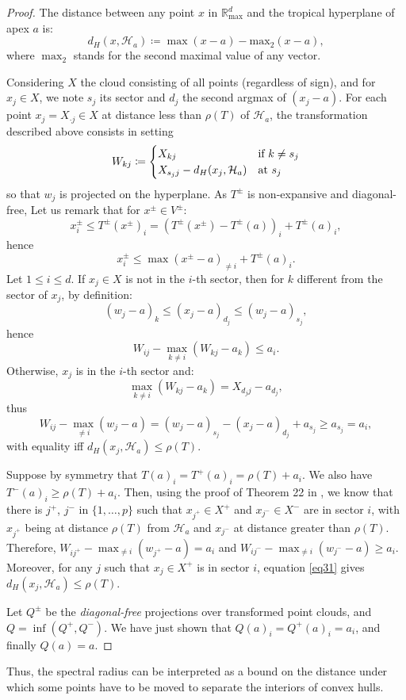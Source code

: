 \documentclass[oneside,UKenglish,a4paper]{amsart}
\numberwithin{equation}{section}
\numberwithin{figure}{section}
\theoremstyle{plain}
\theoremstyle{definition}
\theoremstyle{plain}
\theoremstyle{remark}
\theoremstyle{plain}
\theoremstyle{definition}
\theoremstyle{definition}
\begin{document}
\begin{proof}
The distance between any point $x$ in $\mathbb{R}_{\max}^d$ and the tropical hyperplane of apex $a$ is:
\[ d_H(x, \mathcal{H}_a) \coloneqq \max(x-a) - \text{max}_2 (x-a), \]
where $\max_2$ stands for the second maximal value of any vector.

Considering $X$ the cloud consisting of all points (regardless of
sign), and for $x_{j}\in X$, we note $s_{j}$
its sector and $d_{j}$ the second argmax of $(x_{j}-a)$. For each
point $x_{j}=X_{\cdot j}\in X$ at distance less than $\rho(T)$ of
$\mathcal{H}_{a}$, the transformation described above consists in setting 
\[
W_{kj}\coloneqq\begin{cases}
X_{kj} & \text{if \ensuremath{k\ne s_{j}}}\\
X_{s_{j}j}-d_H(x_{j},\mathcal{H}_{a}) & \text{at \ensuremath{s_{j}}}
\end{cases}
\]
so that $w_{j}$ is projected on the hyperplane. As $T^{\pm}$ is
non-expansive and diagonal-free, Let us remark that for $x^{\pm}\in V^{\pm}$:
\[
x_{i}^{\pm}\le T^{\pm}(x^{\pm})_{i}=\left(T^{\pm}(x^{\pm})-T^{\pm}(a)\right)_{i}+T^{\pm}(a)_{i},
\]
hence
\begin{equation}
\label{eq31}
x_{i}^{\pm}\le\max(x^{\pm}-a)_{\ne i}+T^{\pm}(a)_{i}. 
\end{equation}
Let $1\le i\le d$. If $x_{j}\in X$ is not in the $i$-th sector, then
for $k$ different from the sector of $x_{j}$, by definition: 
\[
(w_{j}-a)_{k}\le(x_{j}-a)_{d_{j}}\le(w_{j}-a)_{s_{j}},
\]
hence 
\[
W_{ij}-\max_{k\ne i}\left(W_{kj}-a_{k}\right)\le a_{i}.
\]
Otherwise, $x_{j}$ is in the $i$-th sector and: 
\[
\max_{k\ne i}\left(W_{kj}-a_{k}\right)=X_{d_{j}j}-a_{d_{j}},
\]
thus 
\[
W_{ij}-\max_{\ne i}\left(w_{j}-a\right)=\left(w_{j}-a\right)_{s_{j}}-\left(x_{j}-a\right)_{d_{j}}+a_{s_{j}}\ge a_{s_{j}}=a_{i},
\]
with equality iff $d_H(x_{j},\mathcal{H}_{a})\leq\rho(T)$.

Suppose by symmetry that $T(a)_{i}=T^{+}(a)_{i}=\rho(T)+a_{i}.$ We
also have $T^{-}(a)_{i}\ge\rho(T)+a_{i}$. Then, using the proof of
Theorem 22 in \cite{Akian2021TropicalLR}, we know that there is
$j^{+}$, $j^{-}$ in $\{1,\ldots, p\}$ such that $x_{j^{+}}\in X^{+}$ and $x_{j^{-}}\in X^{-}$
are in sector $i$, with $x_{j^{+}}$ being at distance $\rho(T)$
from $\mathcal{H}_{a}$ and $x_{j^{-}}$ at distance greater than $\rho(T)$.
Therefore, $W_{ij^{+}}-\max_{\ne i}\left(w_{j^{+}}-a\right)=a_{i}$
and $W_{ij^{-}}-\max_{\ne i}\left(w_{j^{-}}-a\right)\geq a_{i}$.
Moreover, for any $j$ such that $x_{j}\in X^{+}$ is in sector $i$,
equation \ref{eq31} gives $d_H(x_{j},\mathcal{H}_{a})\leq\rho(T)$.

Let $Q^{\pm}$ be the \emph{diagonal-free} projections over transformed
point clouds, and $Q=\inf(Q^{+}, Q^{-}).$ We have just shown that $Q(a)_{i}=Q^{+}(a)_{i}=a_{i}$,
and finally $Q(a)=a$.
\end{proof}
%
Thus, the spectral radius can be interpreted as a bound on the distance
under which some points have to be moved to separate the interiors of convex hulls.
\end{document}
